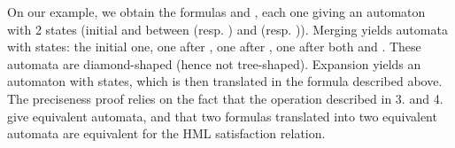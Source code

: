 On our example, we obtain the formulas  and ,
each one giving an automaton with 2 states (initial and between 
(resp. ) and  (resp. )).
Merging yields automata with  states: the initial one, one after
, one after , one after both  and . These automata
are diamond-shaped (hence not tree-shaped).
Expansion yields an automaton with  states, which is then translated
in the formula described above.
The preciseness proof relies on the fact that the operation described
in 3. and 4. give equivalent automata, and that two formulas
translated into two equivalent automata are equivalent for the HML
satisfaction relation.












